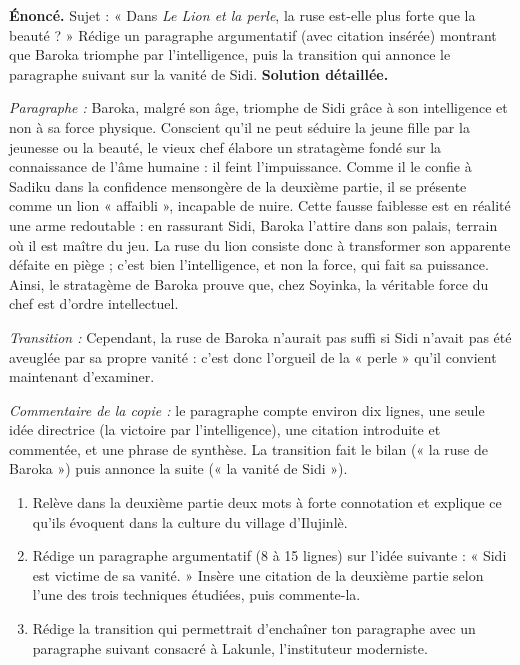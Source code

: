 \documentclass[11pt]{article}
\begin{document}
\begin{exoresolu}
\textbf{Énoncé.} Sujet : « Dans \emph{Le Lion et la perle}, la ruse est-elle plus forte que la beauté ? » Rédige un paragraphe argumentatif (avec citation insérée) montrant que Baroka triomphe par l'intelligence, puis la transition qui annonce le paragraphe suivant sur la vanité de Sidi.
\tcblower
\textbf{Solution détaillée.}

\emph{Paragraphe :} Baroka, malgré son âge, triomphe de Sidi grâce à son intelligence et non à sa force physique. Conscient qu'il ne peut séduire la jeune fille par la jeunesse ou la beauté, le vieux chef élabore un stratagème fondé sur la connaissance de l'âme humaine : il feint l'impuissance. Comme il le confie à Sadiku dans la confidence mensongère de la deuxième partie, il se présente comme un lion « affaibli », incapable de nuire. Cette fausse faiblesse est en réalité une arme redoutable : en rassurant Sidi, Baroka l'attire dans son palais, terrain où il est maître du jeu. La ruse du lion consiste donc à transformer son apparente défaite en piège ; c'est bien l'intelligence, et non la force, qui fait sa puissance. Ainsi, le stratagème de Baroka prouve que, chez Soyinka, la véritable force du chef est d'ordre intellectuel.

\emph{Transition :} Cependant, la ruse de Baroka n'aurait pas suffi si Sidi n'avait pas été aveuglée par sa propre vanité : c'est donc l'orgueil de la « perle » qu'il convient maintenant d'examiner.

\emph{Commentaire de la copie :} le paragraphe compte environ dix lignes, une seule idée directrice (la victoire par l'intelligence), une citation introduite et commentée, et une phrase de synthèse. La transition fait le bilan (« la ruse de Baroka ») puis annonce la suite (« la vanité de Sidi »).
\end{exoresolu}

\begin{exercice}
\begin{enumerate}
\item Relève dans la deuxième partie deux mots à forte connotation et explique ce qu'ils évoquent dans la culture du village d'Ilujinlè.
\item Rédige un paragraphe argumentatif (8 à 15 lignes) sur l'idée suivante : « Sidi est victime de sa vanité. » Insère une citation de la deuxième partie selon l'une des trois techniques étudiées, puis commente-la.
\item Rédige la transition qui permettrait d'enchaîner ton paragraphe avec un paragraphe suivant consacré à Lakunle, l'instituteur moderniste.
\end{enumerate}
\end{exercice}
\end{document}

